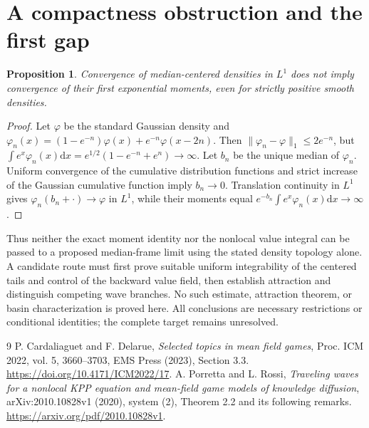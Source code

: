 \documentclass[11pt]{article}
\newtheorem{proposition}[theorem]{Proposition}
\newcommand{\dd}{\mathrm d}
\begin{document}
\section{A compactness obstruction and the first gap}
\begin{proposition}
Convergence of median-centered densities in $L^1$ does not imply convergence of their first exponential moments, even for strictly positive smooth densities.
\end{proposition}
\begin{proof}
Let $\varphi$ be the standard Gaussian density and $\varphi_n(x)=(1-e^{-n})\varphi(x)+e^{-n}\varphi(x-2n)$. Then $\|\varphi_n-\varphi\|_1\le2e^{-n}$, but
$\int e^x\varphi_n(x)\dd x=e^{1/2}(1-e^{-n}+e^n)\to\infty$.
Let $b_n$ be the unique median of $\varphi_n$. Uniform convergence of the cumulative distribution functions and strict increase of the Gaussian cumulative function imply $b_n\to0$. Translation continuity in $L^1$ gives $\varphi_n(b_n+\cdot)\to\varphi$ in $L^1$, while their moments equal $e^{-b_n}\int e^x\varphi_n(x)\dd x\to\infty$.
\end{proof}
Thus neither the exact moment identity nor the nonlocal value integral can be passed to a proposed median-frame limit using the stated density topology alone. A candidate route must first prove suitable uniform integrability of the centered tails and control of the backward value field, then establish attraction and distinguish competing wave branches. No such estimate, attraction theorem, or basin characterization is proved here. All conclusions are necessary restrictions or conditional identities; the complete target remains unresolved.

\begin{thebibliography}{9}
 P. Cardaliaguet and F. Delarue, \emph{Selected topics in mean field games}, Proc. ICM 2022, vol. 5, 3660--3703, EMS Press (2023), Section 3.3. \url{https://doi.org/10.4171/ICM2022/17}.
 A. Porretta and L. Rossi, \emph{Traveling waves for a nonlocal KPP equation and mean-field game models of knowledge diffusion}, arXiv:2010.10828v1 (2020), system (2), Theorem 2.2 and its following remarks. \url{https://arxiv.org/pdf/2010.10828v1}.
\end{thebibliography}
\end{document}
